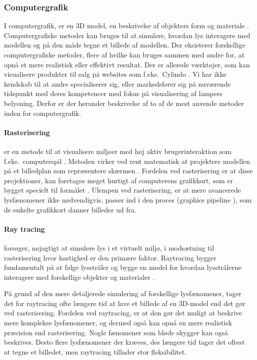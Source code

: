 \subsubsection{Computergrafik}
\label{sec:computergrafik}
I computergrafik, er en 3D model, en beskrivelse af objekters form og materiale \cite{computergrafik_introduktion}. Computergrafiske metoder kan bruges til at simulere, hvordan lys interagere med modellen og på den måde tegne et billede af modellen. Der eksisterer forskellige computergrafiske metoder, flere af hvilke kan bruges sammen med andre for, at opnå et mere realistisk eller effektivt resultat. Der er allerede værktøjer, som kan visualisere produkter til salg på websites som f.eks.\ Cylindo \cite{Cylindo}. Vi har ikke kendskab til at andre specialiserer sig, eller markedsfører sig på nuværende tidspunkt med deres kompetencer med fokus på visualisering af lampers belysning. Derfor er der herunder beskrivelse af to af de mest anvende metoder inden for computergrafik.

\paragraph{Rasterisering}
er en metode til at visualisere miljøer med høj aktiv brugerinteraktion som f.eks.\ computerspil \cite{rastarization}. Metoden virker ved rent matematisk at projektere modellen på et billedplan som repræsentere skærmen \cite{rastarization}. Fordelen ved rasterisering er at disse projektioner, kan foretages meget hurtigt af computerens grafikkort, som er bygget specielt til formålet \cite{rastarization}. Ulempen ved rasterisering, er at mere avancerede lysfænomener ikke nødvendigvis, passer ind i den proces (graphics pipeline \cite{rastarization}), som de enkelte grafikkort danner billeder ud fra. 

\paragraph{Ray tracing} forsøger, nøjagtigt at simulere lys i et virtuelt miljø, i modsætning til rasterisering hvor hastighed er den primære faktor. Raytracing bygger fundamentalt på at følge lysstråler og bygge en model for hvordan lysstrålerne interagere med forskellige objekter og materialer \cite{raytracing_for_begyndere}. 

På grund af den mere detaljerede simulering af forskellige lysfænomener, tager det for raytracing ofte længere tid at lave et billede af en 3D-model end det gør ved rasterisering. Fordelen ved raytracing, er at den gør det muligt at beskrive mere komplekse lysfænomener, og dermed også kan opnå en mere realistisk præcision end rasterisering\cite{raytracingvsrastarizatioin}. Nogle fænomener som bløde skygger kan også beskrives\cite{softshadow}. Desto flere lysfænomener der kræves, des længere tid tager det oftest at tegne et billedet, men raytracing tillader stor fleksibilitet.
